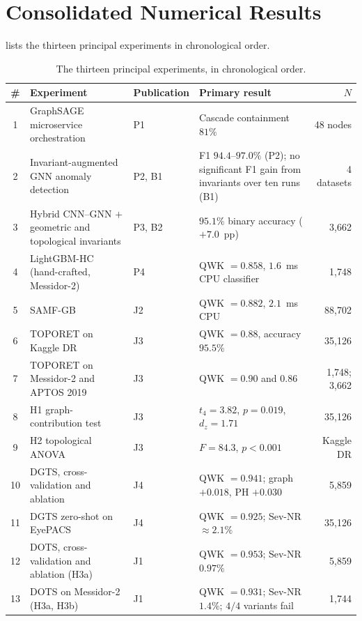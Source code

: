 \chapter{Consolidated Numerical Results}
\label{app:results}

 lists the thirteen principal experiments in chronological order.

\begin{table}[!htbp]
\centering
\caption[The thirteen principal experiments, in chronological order]{The thirteen principal experiments, in chronological order.}
\label{tab:experiments}
\small
\begin{tabular}{@{}c P{4.6cm} l P{4.3cm} r@{}}
\toprule
\# & Experiment & Publication & Primary result & $N$ \\
 & GraphSAGE microservice orchestration & P1~\cite{belhadj2025icaart} & Cascade containment $81\%$ & 48 nodes \\
2 & Invariant-augmented GNN anomaly detection & P2, B1~\cite{belhadj2026invariants,belhadj2026lnaiinv} & F1 $94.4$--$97.0\%$ (P2); no significant F1 gain from invariants over ten runs (B1) & 4 datasets \\
3 & Hybrid CNN--GNN $+$ geometric and topological invariants & P3, B2~\cite{belhadj2026hybrid,mezghich2026lnaitopo} & $95.1\%$ binary accuracy ($+7.0$~pp) & 3{,}662 \\
4 & LightGBM-HC (hand-crafted, Messidor-2) & P4~\cite{belhadj2026icpram} & QWK $=0.858$, $1.6$~ms CPU classifier & 1{,}748 \\
5 & SAMF-GB & J2~\cite{belhadj2026samfgb} & QWK $=0.882$, $2.1$~ms CPU & 88{,}702 \\
6 & TOPORET on Kaggle DR & J3~\cite{belhadj2025plos} & QWK $=0.88$, accuracy $95.5\%$ & 35{,}126 \\
7 & TOPORET on Messidor-2 and APTOS 2019 & J3~\cite{belhadj2025plos} & QWK $=0.90$ and $0.86$ & 1{,}748; 3{,}662 \\
8 & H1 graph-contribution test & J3~\cite{belhadj2025plos} & $t_4=3.82$, $p=0.019$, $d_z=1.71$ & 35{,}126 \\
9 & H2 topological ANOVA & J3~\cite{belhadj2025plos} & $F=84.3$, $p<0.001$ & Kaggle DR \\
10 & DGTS, cross-validation and ablation & J4~\cite{belhadj2026dgts} & QWK $=0.941$; graph $+0.018$, PH $+0.030$ & 5{,}859 \\
11 & DGTS zero-shot on EyePACS & J4~\cite{belhadj2026dgts} & QWK $=0.925$; Sev-NR $\approx2.1\%$ & 35{,}126 \\
12 & DOTS, cross-validation and ablation (H3a) & J1~\cite{belhadj2026dots} & QWK $=0.953$; Sev-NR $0.97\%$ & 5{,}859 \\
13 & DOTS on Messidor-2 (H3a, H3b) & J1~\cite{belhadj2026dots} & QWK $=0.931$; Sev-NR $1.4\%$; $4/4$ variants fail & 1{,}744 \\
\bottomrule
\end{tabular}
\end{table}

